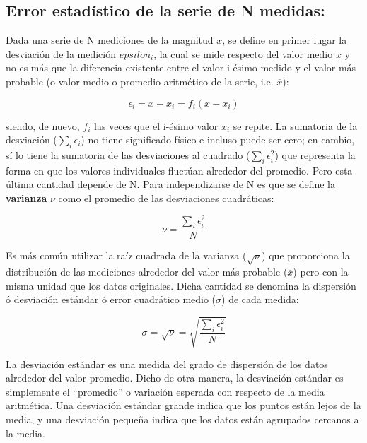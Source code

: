 \subsection{Error estadístico de la serie de N medidas:}

Dada  una  serie  de N  mediciones  de  la  magnitud $x$,  se  define  en  primer  lugar la desviación  de  la medición $epsilon_i$,  
la  cual  se  mide  respecto  del  valor  medio $x$  y  no  es  más  que  la  diferencia  existente entre  el  valor i-ésimo  
medido y el  valor  más  probable  (o  valor  medio  o  promedio  aritmético  de  la serie, i.e. $\overline{x}$): 

\begin{equation}
\epsilon_{i} = x - x_{i} = f_{i}( x - x_{i} ) 
\end{equation}

siendo, de nuevo, $f_i$ las veces que el i-ésimo valor $x_i$ se repite. La  sumatoria  de  la  desviación  ($\sum_i \epsilon_i$)  
no  tiene  significado  físico  e  incluso  puede  ser  cero;  en cambio, sí lo tiene la sumatoria de las desviaciones al 
cuadrado ($\sum_i \epsilon_i^2$) que representa la forma en que los valores individuales fluctúan alrededor del promedio.  Pero 
esta última cantidad depende de N.  Para independizarse de N es que se define la \textbf{varianza} $\nu$ como el promedio de las 
desviaciones cuadráticas:

\begin{equation}
 \nu = \frac{\sum_i \epsilon_i^2}{N}
\end{equation}

Es más común utilizar la raíz cuadrada de la varianza ($\sqrt{\nu}$) que proporciona la distribución de las mediciones alrededor 
del valor más probable ($\overline{x}$) pero con la misma unidad que los datos originales.  Dicha  cantidad  se  denomina  la 
dispersión  ó desviación  estándar  ó error  cuadrático  medio ($\sigma$)  de cada medida:

\begin{equation}
 \sigma = \sqrt{\nu} =\sqrt{\frac{\sum_i \epsilon_i^2}{N}}
\end{equation}

La desviación estándar es una medida del grado de dispersión de los datos alrededor del valor promedio.  Dicho de otra manera, la 
desviación estándar es simplemente el ``promedio'' o variación esperada con respecto de la media aritmética.  Una desviación 
estándar grande indica que los puntos están lejos de la media, y una desviación pequeña indica que los datos están agrupados 
cercanos a la media.\\

